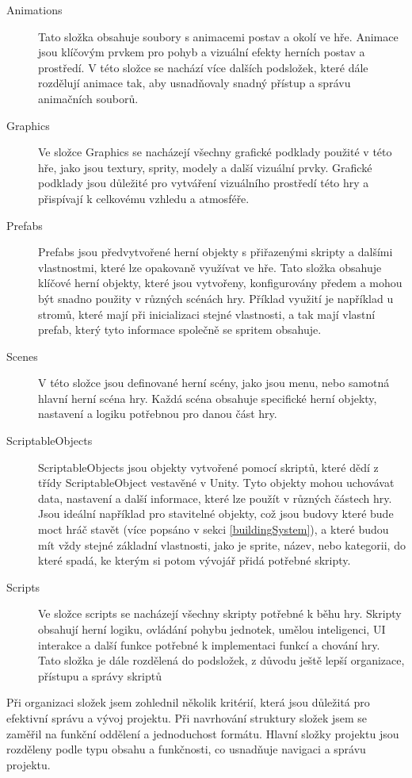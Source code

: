 \begin{description}
	\item[Animations] Tato složka obsahuje soubory s animacemi postav a okolí ve hře. Animace jsou klíčovým prvkem pro pohyb a vizuální efekty herních postav a prostředí. V této složce se nachází více dalších podsložek, které dále rozdělují animace tak, aby usnadňovaly snadný přístup a správu animačních souborů.
	\item[Graphics] Ve složce Graphics se nacházejí všechny grafické podklady použité v této hře, jako jsou textury, sprity, modely a další vizuální prvky. Grafické podklady jsou důležité pro vytváření vizuálního prostředí této hry a přispívají k celkovému vzhledu a atmosféře.
	\item[Prefabs] Prefabs jsou předvytvořené herní objekty s přiřazenými skripty a dalšími vlastnostmi, které lze opakovaně využívat ve hře.
	Tato složka obsahuje klíčové herní objekty, které jsou vytvořeny, konfigurovány předem a mohou být snadno použity v různých scénách hry. Příklad využití je například u stromů, které mají při inicializaci stejné vlastnosti, a tak mají vlastní prefab, který tyto informace společně se spritem obsahuje.
	\item[Scenes] V této složce jsou definované herní scény, jako jsou menu, nebo samotná hlavní herní scéna hry. Každá scéna obsahuje specifické herní objekty, nastavení a logiku potřebnou pro danou část hry.
	\item[ScriptableObjects] ScriptableObjects jsou objekty vytvořené pomocí skriptů, které dědí z třídy ScriptableObject vestavěné v Unity. Tyto objekty mohou uchovávat data, nastavení a další informace, které lze použít v různých částech hry. Jsou ideální například pro stavitelné objekty, což jsou budovy které bude moct hráč stavět (více popsáno v sekci \ref{buildingSystem}), a které budou mít vždy stejné základní vlastnosti, jako je sprite, název, nebo kategorii, do které spadá, ke kterým si potom vývojář přidá potřebné skripty.
	\item[Scripts] Ve složce scripts se nacházejí všechny skripty potřebné k běhu hry. Skripty obsahují herní logiku, ovládání pohybu jednotek, umělou inteligenci, UI interakce a další funkce potřebné k implementaci funkcí a chování hry. Tato složka je dále rozdělená do podsložek, z důvodu ještě lepší organizace, přístupu a správy skriptů
\end{description}

Při organizaci složek jsem zohlednil několik kritérií, která jsou důležitá pro efektivní správu a vývoj projektu. Při navrhování struktury složek jsem se zaměřil na funkční oddělení a jednoduchost formátu. Hlavní složky projektu jsou rozděleny podle typu obsahu a funkčnosti, co usnadňuje navigaci a správu projektu.

